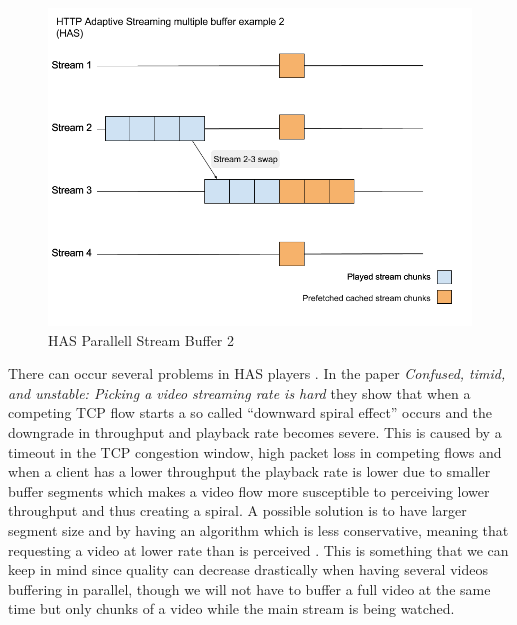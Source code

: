\documentclass[9pt,a4paper]{acmproc}
\begin{document}
\begin{figure}[!ht]
\begin{center}
\includegraphics[scale=0.3]{HAS2.png}
\caption{HAS Parallell Stream Buffer 2}
\label{fig:HAS2}
\end{center}
\end{figure}

There can occur several problems in HAS players \cite{qualbranch}. In the paper \textit{Confused, timid, and unstable: Picking a video streaming rate is hard} they show that when a competing TCP flow starts a so called “downward spiral effect” occurs and the downgrade in throughput and playback rate becomes severe\cite{streamrate}. This is caused by a timeout in the TCP congestion window, high packet loss in competing flows and when a client has a lower throughput the playback rate is lower due to smaller buffer segments which makes a video flow more susceptible to perceiving lower throughput and thus creating a spiral. A possible solution is to have larger segment size and by having an algorithm which is less conservative, meaning that requesting a video at lower rate than is perceived \cite{streamrate}. This is something that we can keep in mind since quality can decrease drastically when having several videos buffering in parallel, though we will not have to buffer a full video at the same time but only chunks of a video while the main stream is being watched.
\end{document}
